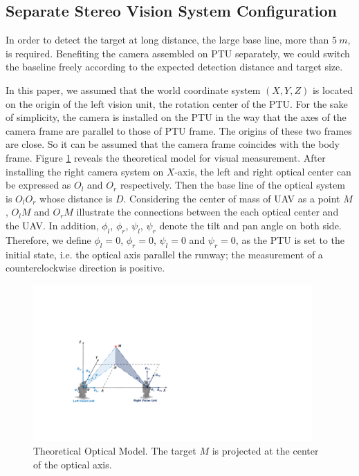 \documentclass[journal,article,submit,moreauthors,pdftex,10pt,a4paper]{mdpi}
\begin{document}
\subsection{Separate Stereo Vision System Configuration}
In order to detect the target at long distance, the large base line, more than $5\ m $, is required. Benefiting the camera assembled on PTU separately, we could switch the baseline freely according to the expected detection distance and target size.

In this paper, we assumed that the world coordinate system $(X, Y, Z)$ is located on the origin of the left vision unit, the rotation center of the PTU. For the sake of simplicity, the camera is installed on the PTU in the way that the axes of the camera frame are parallel to those of PTU frame. The origins of these two frames are close. So it can be assumed that the camera frame coincides with the body frame. Figure  \ref{fig:TheoreticalModel} reveals the theoretical model for visual measurement. After installing the right camera system on ${X}$-axis, the left and right optical center can be expressed as ${O_l}$ and ${O_r}$ respectively. Then the base line of the optical system is $O_lO_r$ whose distance is ${D}$. Considering the center of mass of UAV as a point ${M}$, ${O_lM}$ and ${O_rM}$ illustrate the connections between the each optical center and the UAV. In addition, ${\phi_l}$, ${\phi_r}$, ${\psi_l}$, ${\psi_r}$ denote the tilt and pan angle on both side. Therefore, we define $\phi_l= 0$, $\phi_r=0$, ${\psi_l=0}$ and ${\psi_r=0}$, as the PTU is set to the initial state, i.e. the optical axis parallel the runway; the measurement of a counterclockwise direction is positive.

\begin{figure}[!tb]
	\centering
	\includegraphics[height=6cm]{figs/Fig03_Stereo.pdf}	
	\caption{Theoretical Optical Model. The target $M$ is projected at the center of the optical axis.}
	\label{fig:TheoreticalModel}
\end{figure}
\end{document}
